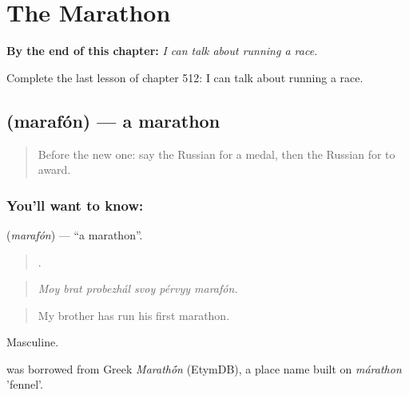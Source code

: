 
\chapter{The Marathon}
\label{ch:ru-the-marathon}

\begin{chapteropening}
\textbf{By the end of this chapter:} \emph{I can talk about running a race.}

Complete the last lesson of chapter 512: I can talk about running a race.
\end{chapteropening}

\section[\texorpdfstring{\ru{марафон} (marafón)}{марафон (marafón)}]{ (marafón) — a marathon}

\label{lesson:RU-C512-marafon}



\begin{quote}
Before the new one: say the Russian for a medal, then the Russian for to award.
\end{quote}

\subsection*{You'll want to know: }
\textbf{} (\emph{marafón}) — \textquotedblleft{}a marathon\textquotedblright{}.

\begin{quote}
     .
\end{quote}

\begin{quote}
\emph{Moy brat probezhál svoy pérvyy marafón.}
\end{quote}

\begin{quote}
My brother has run his first marathon.
\end{quote}

Masculine.

\begin{cousinweb}
\emph{} was borrowed from Greek \emph{Marath\'{\={o}}n} (EtymDB), a place name built on \emph{márathon} 'fennel'.
\end{cousinweb}

